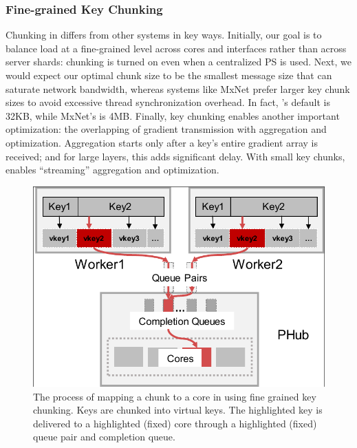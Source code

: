 \subsubsection{Fine-grained Key Chunking}


Chunking in \phub differs from other systems in key ways. Initially, our goal is to balance load at a fine-grained level across cores and interfaces rather than across server shards: chunking is turned on even when a centralized PS is used. Next, we would expect our optimal chunk size to be the smallest message size that can saturate network bandwidth, whereas systems like MxNet prefer larger key chunk sizes to avoid excessive thread synchronization overhead.
In fact, \phub's default is 32KB, while MxNet's is 4MB.
Finally, key chunking enables another important optimization: the overlapping of gradient transmission with aggregation and optimization. Aggregation starts only after a key's entire gradient array is received; and for large layers, this adds significant delay. With small key chunks, \phub enables ``streaming'' aggregation and optimization.

\begin{figure}[t!]
	\centering
	\includegraphics[width=.5\linewidth,trim=1 1 1 1,clip]{Figures/MappingChunkToCore.pdf}
	\caption{The process of mapping a chunk to a core in \phub using fine grained key chunking. Keys are chunked into virtual keys. The highlighted key is delivered to a highlighted (fixed) core through a highlighted (fixed) queue pair and completion queue. }
	\label{fig:mappingChunkToCore}
\end{figure}


